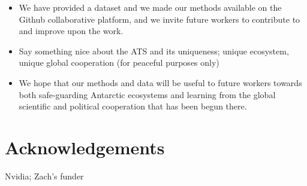 \documentclass[12pt]{article}
\begin{document}
\begin{itemize}
    \item We have provided a dataset and we made our methods available
    on the Github collaborative platform,
    and we invite future workers to contribute to and improve upon the work.
    \item Say something nice about the ATS and its uniqueness;
    unique ecosystem, unique global cooperation (for peaceful purposes only)
    \item We hope that our methods and data will be useful to future workers
    towards both safe-guarding Antarctic ecosystems 
    and learning from the global scientific and political cooperation that has 
    been begun there.
\end{itemize}

\section{Acknowledgements}

Nvidia; Zach's funder



\end{document}
